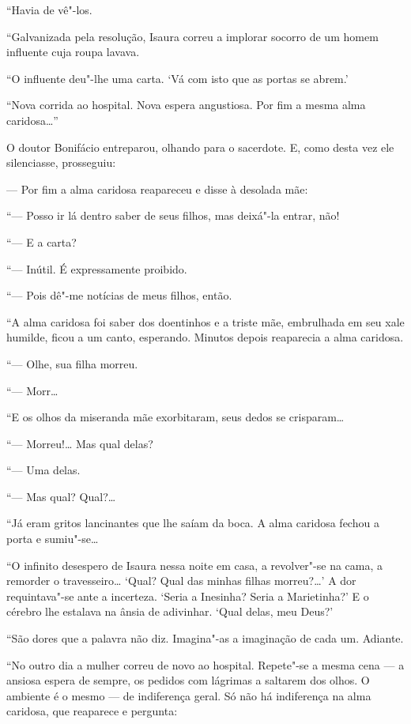 ``Havia de vê"-los.

``Galvanizada pela resolução, Isaura correu a implorar socorro de um
homem influente cuja roupa lavava.

``O influente deu"-lhe uma carta. `Vá com isto que as portas se abrem.'

``Nova corrida ao hospital. Nova espera angustiosa. Por fim a mesma alma
caridosa\ldots{}''

O doutor Bonifácio entreparou, olhando para o sacerdote. E, como desta
vez ele silenciasse, prosseguiu:

--- Por fim a alma caridosa reapareceu e disse à desolada mãe:

``--- Posso ir lá dentro saber de seus filhos, mas deixá"-la entrar, não!

``--- E a carta?

``--- Inútil. É expressamente proibido.

``--- Pois dê"-me notícias de meus filhos, então.

``A alma caridosa foi saber dos doentinhos e a triste mãe, embrulhada em
seu xale humilde, ficou a um canto, esperando. Minutos depois reaparecia
a alma caridosa.

``--- Olhe, sua filha morreu.

``--- Morr\ldots{}

``E os olhos da miseranda mãe exorbitaram, seus dedos se crisparam\ldots{}

``--- Morreu!\ldots{} Mas qual delas?

``--- Uma delas.

``--- Mas qual? Qual?\ldots{}

``Já eram gritos lancinantes que lhe saíam da boca. A alma caridosa
fechou a porta e sumiu"-se\ldots{}

``O infinito desespero de Isaura nessa noite em casa, a revolver"-se na
cama, a remorder o travesseiro\ldots{} `Qual? Qual das minhas filhas
morreu?\ldots{}' A dor requintava"-se ante a incerteza. `Seria a Inesinha?
Seria a Marietinha?' E o cérebro lhe estalava na ânsia de adivinhar.
`Qual delas, meu Deus?'

``São dores que a palavra não diz. Imagina"-as a imaginação de cada um.
Adiante.

``No outro dia a mulher correu de novo ao hospital. Repete"-se a mesma
cena --- a ansiosa espera de sempre, os pedidos com lágrimas a saltarem
dos olhos. O ambiente é o mesmo --- de indiferença geral. Só não há
indiferença na alma caridosa, que reaparece e pergunta:

